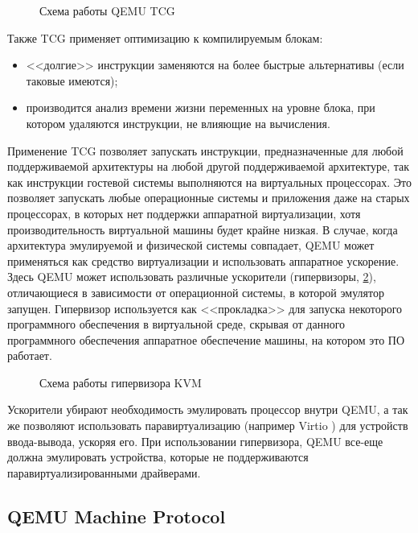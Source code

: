 \begin{figure}[!htbp]
    \centering
    
    \caption{Схема работы QEMU TCG}\label{fig:qemu-tcg}
\end{figure}

Также TCG применяет оптимизацию к компилируемым блокам:
\begin{itemize}
    \item <<долгие>> инструкции заменяются на более быстрые альтернативы (если таковые имеются);
    \item производится анализ времени жизни переменных на уровне блока, при котором
        удаляются инструкции, не влияющие на вычисления.
\end{itemize}

Применение TCG позволяет запускать инструкции, предназначенные для любой поддерживаемой архитектуры
на любой другой поддерживаемой архитектуре, так как инструкции гостевой системы выполняются на виртуальных процессорах.
Это позволяет запускать любые операционные системы и приложения даже на старых процессорах, в которых нет поддержки
аппаратной виртуализации, хотя производительность виртуальной машины будет крайне низкая.
В случае, когда архитектура эмулируемой и физической системы совпадает, QEMU может применяться как средство виртуализации
и использовать аппаратное ускорение.
Здесь QEMU может использовать различные ускорители (гипервизоры, \cref{fig:kvm}),
отличающиеся в зависимости от операционной системы, в которой эмулятор запущен.
Гипервизор используется как <<прокладка>> для запуска некоторого программного обеспечения в виртуальной среде,
скрывая от данного программного обеспечения аппаратное обеспечение машины, на котором это ПО работает.

\begin{figure}[!htbp]
    \centering
    
    \caption{Схема работы гипервизора KVM \cite{kvm}}\label{fig:kvm}
\end{figure}

Ускорители убирают необходимость эмулировать процессор внутри QEMU, а так же позволяют использовать
паравиртуализацию (например Virtio \cite{virtio}) для устройств ввода-вывода, ускоряя его.
При использовании гипервизора, QEMU все-еще должна эмулировать устройства, которые не поддерживаются
паравиртуализированными драйверами.


\subsection{QEMU Machine Protocol}\label{sec:ch1/sec4/sub2/sub2}

